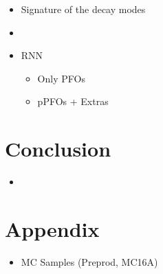 \begin{itemize}
\item Signature of the decay modes
\item
\item RNN
  \begin{itemize}
  \item Only PFOs
  \item pPFOs + Extras
  \end{itemize}
\end{itemize}

\section{Conclusion}

\begin{itemize}
\item
\end{itemize}

\section{Appendix}

\begin{itemize}
\item MC Samples (Preprod, MC16A)
\end{itemize}
